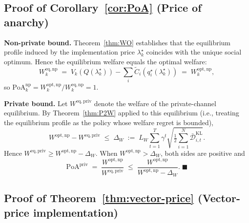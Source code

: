 \documentclass{article}
\begin{document}
\subsection{Proof of Corollary~\ref{cor:PoA} (Price of anarchy)}\label{app:PoA}

\textbf{Non-private bound.} Theorem~\ref{thm:WO} establishes that the equilibrium profile induced by the implementation price $\lambda_k^\star$ coincides with the unique social optimum. Hence the equilibrium welfare equals the optimal welfare:
$$W^{\mathrm{eq,np}}_k \;=\; V_k(Q(\lambda_k^\star)) - \sum_i \widetilde C_i(q_i^\star(\lambda_k^\star)) \;=\; W^{\mathrm{opt,np}}_k,$$
so $\mathrm{PoA}_k^{\mathrm{np}} = W^{\mathrm{opt,np}}_k / W^{\mathrm{eq,np}}_k = 1$.

\textbf{Private bound.} Let $W^{\mathrm{eq,priv}}$ denote the welfare of the private-channel equilibrium. By Theorem~\ref{thm:P2W} applied to this equilibrium (i.e., treating the equilibrium profile as the policy whose welfare regret is bounded),
$$W^{\mathrm{opt,np}} - W^{\mathrm{eq,priv}} \;\le\; \Delta_W \;:=\; L_W \sum_{t=1}^T \gamma^t \sqrt{\tfrac{1}{2} \sum_{i=1}^N \bar{\mathcal{D}}_{i,t}^{\mathrm{KL}}}.$$
Hence $W^{\mathrm{eq,priv}} \ge W^{\mathrm{opt,np}} - \Delta_W$. When $W^{\mathrm{opt,np}} > \Delta_W$, both sides are positive and
$$\mathrm{PoA}^{\mathrm{priv}} \;=\; \frac{W^{\mathrm{opt,np}}}{W^{\mathrm{eq,priv}}} \;\le\; \frac{W^{\mathrm{opt,np}}}{W^{\mathrm{opt,np}} - \Delta_W}. \;\blacksquare$$

\subsection{Proof of Theorem~\ref{thm:vector-price} (Vector-price implementation)}\label{app:vector-price}
\end{document}
